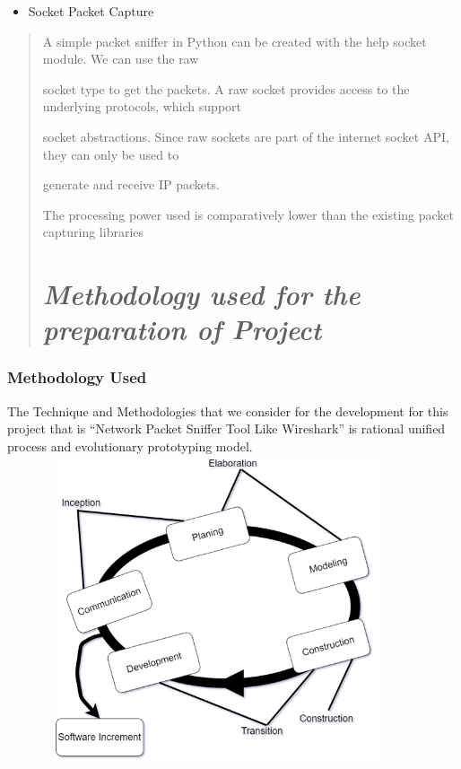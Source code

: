 \documentclass[a4paper,12pt]{report}
\begin{document}
\begin{itemize}
\item
  Socket Packet Capture
\end{itemize}

\begin{quote}
A simple packet sniffer in Python can be created with the help socket
module. We can use the raw

socket type to get the packets. A raw socket provides access to the
underlying protocols, which support

socket abstractions. Since raw sockets are part of the internet socket
API, they can only be used to

generate and receive IP packets.

The processing power used is comparatively lower than the existing
packet capturing libraries

\chapter{\emph{Methodology used for the preparation of Project }}
\end{quote}

\subsection{Methodology Used}

The Technique and Methodologies that we consider for the development for this project that is ``Network Packet Sniffer Tool Like Wireshark'' is rational unified process and evolutionary prototyping model. \\

\includegraphics[width=4.85666in,height=3.55507in]{image9.png}
\end{document}
